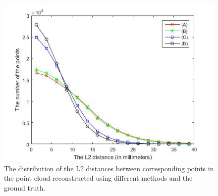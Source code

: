 \begin{figure}[ht]
	\centering
	\includegraphics[width=\columnwidth]{image/distribution.jpg}
	\caption{The distribution of the L2 distances between corresponding points in the point cloud reconstructed using different methods and the ground truth. }
	\label{fig:error-distribution}
\end{figure}

